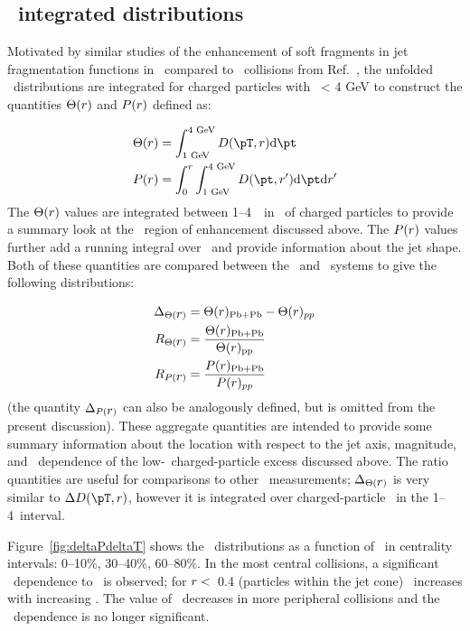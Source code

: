\subsection{\pt\ integrated distributions}
\label{sec:discussion_int}
Motivated by similar studies of the enhancement of soft fragments in 
jet fragmentation functions in \pbpb\ compared to \pp\ collisions from Ref.~\cite{Aaboud:2018hpb}, the unfolded \Dptr\ distributions are integrated for charged particles with \pt\ < 4 GeV to construct the quantities $\Theta(\mbox{$r$})$ and $P(\mbox{$r$})$ defined as:

\begin{align*}
   \Theta(\rvar) &= \int_{1 \text{ GeV}}^{4 \text{ GeV}} \Dptr  \fd \pt \\
   P(\rvar) &= \int_0^r \int_{1 \text{ GeV}}^{4 \text{ GeV}} D(\pt, r') \fd \pt \fd r'
\end{align*}
The $\Theta(\mbox{$r$})$ values are integrated between 1--4~\GeV\ in \pt\ of charged particles to provide a summary look at
the \pt\ region of enhancement discussed above.  The $P(\mbox{$r$})$ values further add a running integral over \rvar\
and provide information about the jet shape.
Both of these quantities are compared between the \pp\ and \pbpb\ systems to give the following distributions:

\begin{align*}
   \Delta_{\Theta(\mbox{$r$})} &= \Theta(\mbox{$r$})_{\mathrm{Pb+Pb}} - \Theta(\mbox{$r$})_{pp} \\
   R_{\Theta(\mbox{$r$})} &= \frac{\Theta(\mbox{$r$})_{\mathrm{Pb+Pb}}}{\Theta(\mbox{$r$})_{\mathrm{pp}}} \\
   R_{P(\mbox{$r$})} &= \frac{P(\mbox{$r$})_{\mathrm{Pb+Pb}}}{P(\mbox{$r$})_{pp}}
\end{align*}
(the quantity $\Delta_{P(\mbox{$r$})}$ can also be analogously defined, but is omitted from the present discussion).
These aggregate quantities are intended to provide some summary information about the location with respect to the 
jet axis, magnitude, and \ptjet\ dependence of the low-\pt\ charged-particle excess discussed above.
The ratio quantities are useful for comparisons to other \pbpb\ measurements; $\Delta_{\Theta(\mbox{$r$})}$ is very similar 
to $\DeltaDptr$, however it is integrated over charged-particle \pt\ in the 1--4~\GeV interval.

Figure~\ref{fig:deltaPdeltaT} shows the \DeltaTheta\ distributions as a function of \rvar\ in centrality intervals: 0--10\%, 30--40\%, 60--80\%.
In the most central collisions, a significant \ptjet\ dependence to \DeltaTheta\ is observed; for $\mbox{$r$} <$~0.4 (particles
within the jet cone) \DeltaTheta\ increases with increasing \ptjet.
The value of \DeltaTheta\ decreases in more peripheral collisions and the \ptjet\ dependence is no longer significant.

